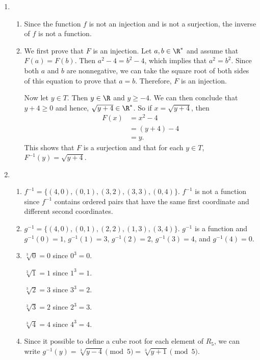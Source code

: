 \begin{enumerate}
\item \begin{enumerate}
\item Since the function $f$ is not an injection and is not a surjection, the inverse of 
$f$ is not a function.

\item We first prove that $F$ is an injection.  Let $a, b \in \R^*$ and assume that 
$F(a) = F(b)$.  Then $a^2 - 4 = b^2 - 4$, which implies that $a^2 = b^2$.  Since both $a$ and $b$ are nonnegative, we can take the square root of both sides of this equation to prove that $a = b$.  Therefore, $F$ is an injection.

Now let $y \in T$.  Then $y \in \R$ and $y \geq -4$.  We can then conclude that 
$y + 4 \geq 0$ and hence, $\sqrt{y + 4} \in \R^*$.  So if $x = \sqrt{y + 4}$, then
\begin{align*}
F(x) &= x^2 - 4 \\
     &= (y + 4) - 4 \\
     &= y.
\end{align*}
This shows that $F$ is a surjection and that for each $y \in T$, $F^{-1}(y) = \sqrt{y + 4}$.
\end{enumerate}



\item \begin{enumerate}
\item $f^{-1} = \{ (4, 0), (0, 1), (3, 2), (3, 3), (0, 4) \}$.  $f^{-1}$ is not a function since $f^{-1}$ contains ordered pairs that have the same first coordinate and different second coordinates.

\item $g^{-1} = \{ (4, 0), (0, 1), (2, 2), (1, 3), (3, 4) \}$.  $g^{-1}$ is a function and 
$g^{-1}(0) = 1$, $g^{-1}(1) = 3$, $g^{-1}(2) = 2$, $g^{-1}(3) = 4$, and $g^{-1}(4) = 0$.

\item \begin{multicols}{2}
$\sqrt[3]{0} = 0$ since $0^3 = 0$.

$\sqrt[3]{1} = 1$ since $1^3 = 1$.

$\sqrt[3]{2} = 3$ since $3^3 = 2$.

$\sqrt[3]{3} = 2$ since $2^3 = 3$.

$\sqrt[3]{4} = 4$ since $4^3 = 4$.
\end{multicols}

\item Since it possible to define a cube root for each element of $R_5$, we can write 
$g^{-1}(y) = \sqrt[3]{y - 4} \pmod 5 = \sqrt[3]{y + 1} \pmod 5$.
\end{enumerate}
\end{enumerate}



